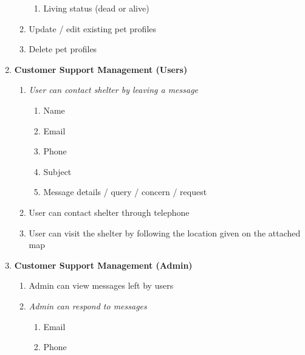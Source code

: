 \begin{enumerate}
\begin{enumerate}
\begin{enumerate}
            \item Living status (dead or alive)
        \end{enumerate}
        \item Update / edit existing pet profiles
        \item Delete pet profiles 
    \end{enumerate}
    \item \textbf{Customer Support Management (Users)} \begin{enumerate}
        \item \textit{User can contact shelter by leaving a message} \begin{enumerate}
            \item Name
            \item Email
            \item Phone
            \item Subject
            \item Message details / query / concern / request 
        \end{enumerate}
        \item User can contact shelter through telephone
        \item User can visit the shelter by following the location given on the attached map
    \end{enumerate}
    \item \textbf{Customer Support Management (Admin)} \begin{enumerate}
        \item Admin can view messages left by users
        \item \textit{Admin can respond to messages} \begin{enumerate}
            \item Email
            \item Phone
        \end{enumerate}
    \end{enumerate}
\end{enumerate}

